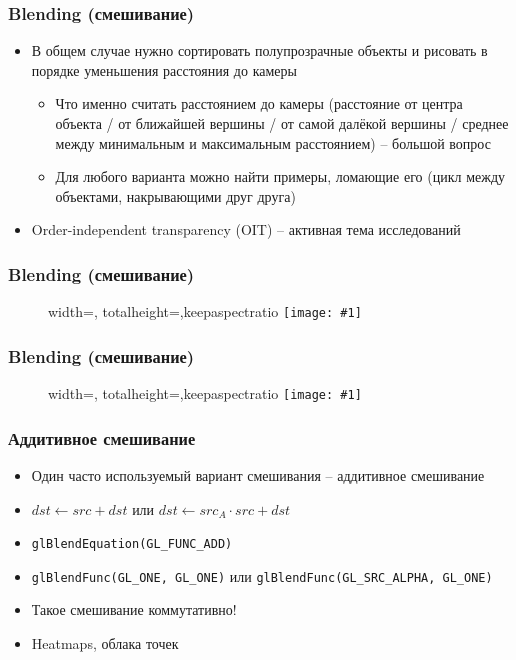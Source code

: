 \documentclass{beamer}
\newcommand{\slideimage}[1]{
  \begin{figure}
    \begin{adjustbox}{width=\textwidth, totalheight=\textheight-2\baselineskip-2\baselineskip,keepaspectratio}
      \texttt{[image: \#1]}
    \end{adjustbox}
  \end{figure}
}
\begin{document}
\begin{frame}[fragile]
\frametitle{Blending (смешивание)}
\begin{itemize}
\item В общем случае нужно сортировать полупрозрачные объекты и рисовать в порядке уменьшения расстояния до камеры
\begin{itemize}
\item Что именно считать расстоянием до камеры (расстояние от центра объекта / от ближайшей вершины / от самой далёкой вершины / среднее между минимальным и максимальным расстоянием) -- большой вопрос
\item Для любого варианта можно найти примеры, ломающие его (цикл между объектами, накрывающими друг друга)
\end{itemize}
\item Order-independent transparency (OIT) -- активная тема исследований
\end{itemize}
\end{frame}

\begin{frame}[fragile]
\frametitle{Blending (смешивание)}
\slideimage{blending_sorted.png}
\end{frame}

\begin{frame}[fragile]
\frametitle{Blending (смешивание)}
\slideimage{painters.png}
\end{frame}

\begin{frame}[fragile]
\frametitle{Аддитивное смешивание}
\begin{itemize}
\item Один часто используемый вариант смешивания -- аддитивное смешивание
\item \begin{math}dst \leftarrow src + dst\end{math} или \begin{math}dst \leftarrow src_A \cdot src + dst\end{math}
\pause
\item \verb|glBlendEquation(GL_FUNC_ADD)|
\item \verb|glBlendFunc(GL_ONE, GL_ONE)| или \verb|glBlendFunc(GL_SRC_ALPHA, GL_ONE)|
\pause
\item Такое смешивание коммутативно!
\pause
\item Heatmaps, облака точек
\end{itemize}
\end{frame}
\end{document}

